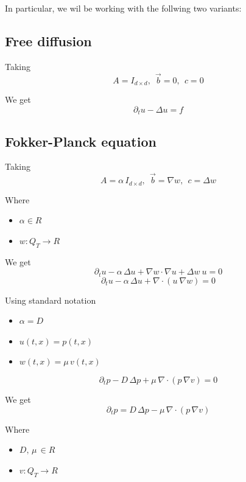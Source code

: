 In particular, we wil be working with the follwing two variants:

\subsection{Free diffusion}

Taking
\[
A=I_{d\times d},\:\: \vec{b} = 0,\:\: c = 0
\]

We get
\[
\partial_t u - \Delta u = f
\]

\subsection{Fokker-Planck equation}

Taking
\[
A=\alpha\,I_{d\times d},\:\: \vec{b} = \nabla w,\:\: c = \Delta w
\]

Where
\begin{itemize}
\item $\alpha \in R$
\item $w : Q_T \to R$
\end{itemize}

We get
\[
\partial_t u - \alpha\,\Delta u + \nabla w \cdot \nabla u + \Delta w\: u = 0
\]
\[
\partial_t u - \alpha\,\Delta u + \nabla\cdot(u~\nabla w) = 0
\]

Using standard notation
\begin{itemize}
\item $ \alpha = D $
\item $ u(t,x) = p(t,x) $
\item $ w(t,x) = \mu\,v(t,x) $
\end{itemize}
\[
\partial_t p - D\,\Delta p + \mu\,\nabla \cdot (p\,\nabla v) = 0
\]

We get
\[
\partial_t p = D\,\Delta p - \mu\,\nabla \cdot (p\,\nabla v)
\]

Where
\begin{itemize}
\item $D,\, \mu \, \in R$
\item $v : Q_T \to R$
\end{itemize}




